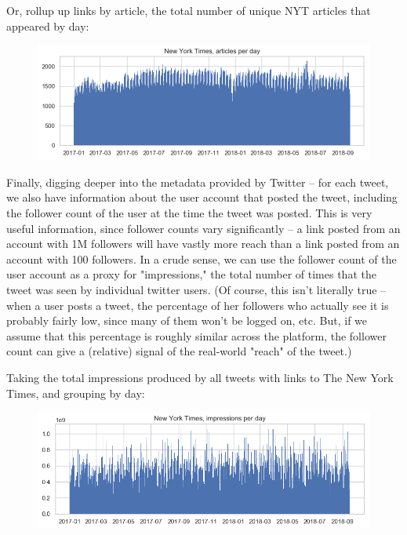 \documentclass{scrartcl}
\begin{document}
Or, rollup up links by article, the total number of unique NYT articles that appeared by day:

\begin{figure}[H]
  \centering
  \includegraphics[width=\textwidth]{figures/nyt-articles-per-day.png}
\end{figure}

Finally, digging deeper into the metadata provided by Twitter -- for each tweet, we also have information about the user account that posted the tweet, including the follower count of the user at the time the tweet was posted. This is very useful information, since follower counts vary significantly -- a link posted from an account with 1M followers will have vastly more reach than a link posted from an account with 100 followers. In a crude sense, we can use the follower count of the user account as a proxy for "impressions," the total number of times that the tweet was seen by individual twitter users. (Of course, this isn't literally true -- when a user posts a tweet, the percentage of her followers who actually see it is probably fairly low, since many of them won't be logged on, etc. But, if we assume that this percentage is roughly similar across the platform, the follower count can give a (relative) signal of the real-world "reach" of the tweet.)

Taking the total impressions produced by all tweets with links to The New York Times, and grouping by day:

\begin{figure}[H]
  \centering
  \includegraphics[width=\textwidth]{figures/nyt-imp-per-day.png}
\end{figure}
\end{document}
